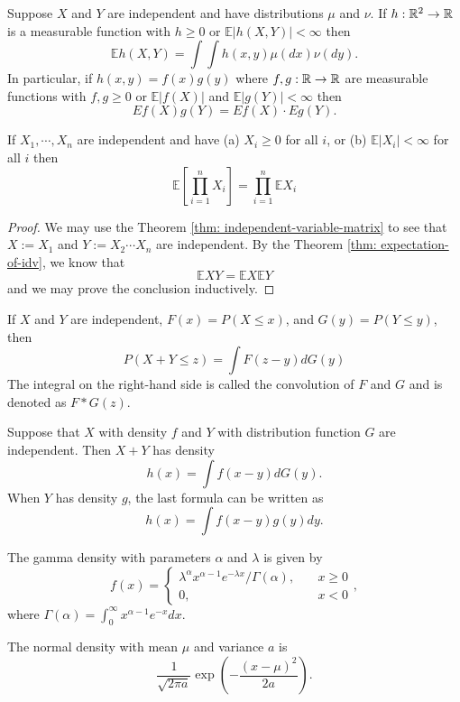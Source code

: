 \begin{theorem}
\label{thm: expectation-of-idv}
    Suppose $X$ and $Y$ are independent and have distributions $\mu$ and $\nu$. If $h : \mathbb{R}^2 \to \mathbb{R}$ is a measurable function with $h \geq 0$ or $\mathbb{E}|h(X, Y )| < \infty$ then
    \[\mathbb{E}h(X, Y ) = \int\int h(x, y) \mu(dx) \nu(dy).\]
    In particular, if $h(x, y) = f(x)g(y)$ where $f, g : \mathbb{R} \to \mathbb{R}$ are measurable
functions with $f, g \geq 0 $ or $\mathbb{E}|f(X)|$ and $\mathbb{E}|g(Y )| < \infty$ then
\[Ef(X)g(Y ) = Ef(X) \cdot Eg(Y ).\]
\end{theorem}

\begin{proposition}
    If $X_1, \cdots , X_n$ are independent and have (a) $X_i \geq 0$ for all $i$, or (b) $\mathbb{E}|X_i| < \infty$ for all $i$ then
    \[\mathbb{E}\left[\prod_{i=1}^n X_i\right] = \prod_{i=1}^n \mathbb{E}X_i\]
\end{proposition}
\begin{proof}
    We may use the Theorem \ref{thm: independent-variable-matrix} to see that $X:= X_1$ and $Y:= X_2\cdots X_n$ are independent. By the Theorem \ref{thm: expectation-of-idv}, we know that
    \[
    \mathbb{E}XY = \mathbb{E}X\mathbb{E}Y
    \]
    and we may prove the conclusion inductively.
\end{proof}

\begin{lemma}
    If $X$ and $Y$ are independent, $F(x) = P(X \leq x)$, and $G(y) = P(Y \leq y)$, then
    \[P(X + Y \leq z) = \int F(z - y) dG(y)\]
    The integral on the right-hand side is called the convolution of $F$ and $G$ and is denoted as $F*G(z)$. 
\end{lemma}

\begin{theorem}
\label{thm: independent-density-form}
    Suppose that $X$ with density $f$ and $Y$ with distribution function $G$ are independent. Then $X + Y$ has density \[h(x) = \int f(x - y) dG(y).\] When $Y$ has density $g$, the last formula can be written as \[h(x) = \int f(x - y) g(y) dy.\]
\end{theorem}

\begin{definition}
     The gamma density with parameters $\alpha$ and $\lambda$ is given by
    \[
    f(x) = \begin{cases}
        \lambda^{\alpha}x^{\alpha-1}e^{-\lambda x}/ \Gamma(\alpha), \quad &x\geq 0\\
        0,&x<0
    \end{cases},
    \]
    where $\Gamma(\alpha) = \int_0^{\infty} x^{\alpha-1}e^{-x}dx$.\par
    The normal density with mean $\mu$ and variance $a$ is
    \[
    \dfrac{1}{\sqrt{2\pi a}}\exp\left({-\dfrac{(x-\mu)^2}{2a}}\right).
    \]
\end{definition}

